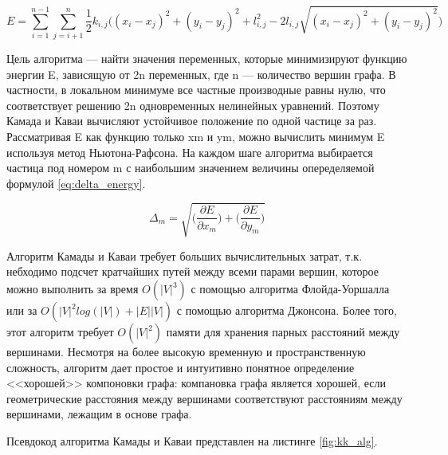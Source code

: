 \documentclass[14pt, russian]{scrartcl}
\begin{document}
\begin{equation}\label{eq:energy_extendet}
  E = \sum_{i = 1}^{n - 1}\sum_{j = i + 1}^{n}{\frac{1}{2}k_{i, j}\bigg( (x_i - x_j)^2 + (y_i - y_j)^2 + l^2_{i, j} - 2 l_{i, j}\sqrt{(x_i - x_j)^2 + (y_i - y_j)^2} \bigg)}
\end{equation} 


Цель алгоритма --- найти значения переменных, которые минимизируют функцию энергии E, зависящую от 2n переменных, где n --- количество вершин графа. В частности, в локальном минимуме все частные производные равны нулю, что соответствует решению 2n одновременных нелинейных уравнений. Поэтому Камада и Каваи вычисляют устойчивое положение по одной частице за раз. Рассматривая E как функцию только xm и ym, можно вычислить минимум E используя метод Ньютона-Рафсона. На каждом шаге алгоритма выбирается частица под номером m с наибольшим значением величины опеределяемой формулой \ref{eq:delta_energy}.

\begin{equation}\label{eq:delta_energy}
  \Delta_m = \sqrt{\bigg( \frac{\partial E}{\partial x_m} \bigg) + \bigg(  \frac{\partial E}{\partial y_m} \bigg)}
\end{equation} 

Алгоритм Камады и Каваи требует больших вычислительных затрат, т.к. небходимо подсчет кратчайших путей между всеми парами вершин, которое можно выполнить за время $O(|V|^3)$ с помощью алгоритма Флойда-Уоршалла или за $O(|V|^2 log(|V|)  + |E||V|)$ с помощью алгоритма Джонсона. Более того, этот алгоритм требует $O(|V|^2)$ памяти для хранения парных расстояний между вершинами. Несмотря на более высокую временную и пространственную сложность, алгоритм дает простое и интуитивно понятное определение <<хорошей>>
компоновки графа: компановка графа является хорошей, если геометрические расстояния между вершинами соответствуют расстояниям между вершинами, лежащим в основе графа.

Псевдокод алгоритма Камады и Каваи представлен на листинге \ref{fig:kk_alg}.
\end{document}
